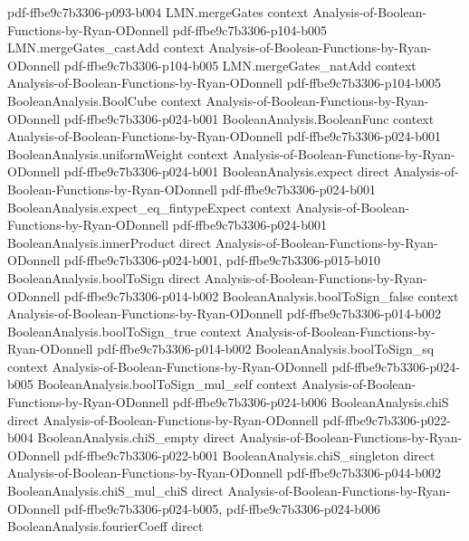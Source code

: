\begin{theorem}
  {pdf-ffbe9c7b3306-p093-b004}
\proofstep
  {LMN.mergeGates}
  {context}
  {Analysis-of-Boolean-Functions-by-Ryan-ODonnell}
  {pdf-ffbe9c7b3306-p104-b005}
\proofstep
  {LMN.mergeGates_castAdd}
  {context}
  {Analysis-of-Boolean-Functions-by-Ryan-ODonnell}
  {pdf-ffbe9c7b3306-p104-b005}
\proofstep
  {LMN.mergeGates_natAdd}
  {context}
  {Analysis-of-Boolean-Functions-by-Ryan-ODonnell}
  {pdf-ffbe9c7b3306-p104-b005}
\proofstep
  {BooleanAnalysis.BoolCube}
  {context}
  {Analysis-of-Boolean-Functions-by-Ryan-ODonnell}
  {pdf-ffbe9c7b3306-p024-b001}
\proofstep
  {BooleanAnalysis.BooleanFunc}
  {context}
  {Analysis-of-Boolean-Functions-by-Ryan-ODonnell}
  {pdf-ffbe9c7b3306-p024-b001}
\proofstep
  {BooleanAnalysis.uniformWeight}
  {context}
  {Analysis-of-Boolean-Functions-by-Ryan-ODonnell}
  {pdf-ffbe9c7b3306-p024-b001}
\proofstep
  {BooleanAnalysis.expect}
  {direct}
  {Analysis-of-Boolean-Functions-by-Ryan-ODonnell}
  {pdf-ffbe9c7b3306-p024-b001}
\proofstep
  {BooleanAnalysis.expect_eq_fintypeExpect}
  {context}
  {Analysis-of-Boolean-Functions-by-Ryan-ODonnell}
  {pdf-ffbe9c7b3306-p024-b001}
\proofstep
  {BooleanAnalysis.innerProduct}
  {direct}
  {Analysis-of-Boolean-Functions-by-Ryan-ODonnell}
  {pdf-ffbe9c7b3306-p024-b001,
    pdf-ffbe9c7b3306-p015-b010}
\proofstep
  {BooleanAnalysis.boolToSign}
  {direct}
  {Analysis-of-Boolean-Functions-by-Ryan-ODonnell}
  {pdf-ffbe9c7b3306-p014-b002}
\proofstep
  {BooleanAnalysis.boolToSign_false}
  {context}
  {Analysis-of-Boolean-Functions-by-Ryan-ODonnell}
  {pdf-ffbe9c7b3306-p014-b002}
\proofstep
  {BooleanAnalysis.boolToSign_true}
  {context}
  {Analysis-of-Boolean-Functions-by-Ryan-ODonnell}
  {pdf-ffbe9c7b3306-p014-b002}
\proofstep
  {BooleanAnalysis.boolToSign_sq}
  {context}
  {Analysis-of-Boolean-Functions-by-Ryan-ODonnell}
  {pdf-ffbe9c7b3306-p024-b005}
\proofstep
  {BooleanAnalysis.boolToSign_mul_self}
  {context}
  {Analysis-of-Boolean-Functions-by-Ryan-ODonnell}
  {pdf-ffbe9c7b3306-p024-b006}
\proofstep
  {BooleanAnalysis.chiS}
  {direct}
  {Analysis-of-Boolean-Functions-by-Ryan-ODonnell}
  {pdf-ffbe9c7b3306-p022-b004}
\proofstep
  {BooleanAnalysis.chiS_empty}
  {direct}
  {Analysis-of-Boolean-Functions-by-Ryan-ODonnell}
  {pdf-ffbe9c7b3306-p022-b001}
\proofstep
  {BooleanAnalysis.chiS_singleton}
  {direct}
  {Analysis-of-Boolean-Functions-by-Ryan-ODonnell}
  {pdf-ffbe9c7b3306-p044-b002}
\proofstep
  {BooleanAnalysis.chiS_mul_chiS}
  {direct}
  {Analysis-of-Boolean-Functions-by-Ryan-ODonnell}
  {pdf-ffbe9c7b3306-p024-b005,
    pdf-ffbe9c7b3306-p024-b006}
\proofstep
  {BooleanAnalysis.fourierCoeff}
  {direct}

\end{theorem}
